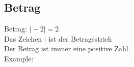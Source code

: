 \subsection{Betrag}

Betrag: $\vert-2 \vert = 2$\\
Das Zeichen $\vert$ ist der Betragsstrich\\
Der Betrag ist immer eine positive Zahl.\\

\hfill \break
Example:\\
\fboxrule=0.8pt \\


